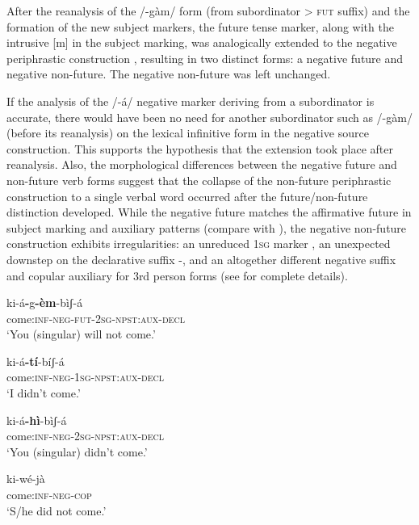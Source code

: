 \documentclass[output=paper]{langsci/langscibook}
\begin{document}
After the reanalysis of the /-gàm/ form (from subordinator {>} \textsc{fut} suffix) and the formation of the new subject markers, the future tense marker, along with the intrusive [m] in the subject marking, was analogically extended to the negative periphrastic construction , resulting in two distinct forms: a negative future and negative non-future. The negative non-future was left unchanged. 

If the analysis of the /-á/ negative marker deriving from a subordinator is accurate, there would have been no need for another subordinator such as /-gàm/ (before its reanalysis) on the lexical infinitive form in the negative source construction. This supports the hypothesis that the extension took place after reanalysis. Also, the morphological differences between the negative future and non-future verb forms suggest that the collapse of the non-future periphrastic construction to a single verbal word occurred after the future/non-future distinction developed. While the negative future matches the affirmative future in subject marking and auxiliary patterns (compare  with ), the negative non-future construction exhibits irregularities: an unreduced \textsc{1sg} marker , an unexpected downstep on the declarative suffix -, and an altogether different negative suffix and copular auxiliary for 3rd person forms  (see \citealt[384-384]{AhlandM2012} for complete details). 

\ea\label{ex:mahland:83}
\gll ki-á\textbf{{}-}g\textbf{{}-èm}{}-bìʃ-á     \\
come:\textsc{inf-neg-fut-2sg-npst:aux-decl} \\
\glt `You (singular) will not come.'
\z

\ea\label{ex:mahland:84}
\gll ki-á\textbf{{}-}\textbf{tí}{}-bíʃ-{\downstep}á  \\
come:\textsc{inf-neg-1sg-npst:aux-decl} \\
\glt `I didn't come.'
\z

\ea\label{ex:mahland:85}
\gll ki-á\textbf{{}-hì}-bìʃ-{\downstep}á  \\
come:\textsc{inf-neg-2sg-npst:aux-decl}\\
\glt `You (singular) didn't come.'
\z

\ea\label{ex:mahland:86}
\gll ki-wé-jà\\
come:\textsc{inf-neg-cop}\\
\glt `S/he did not come.'
\z
\end{document}
